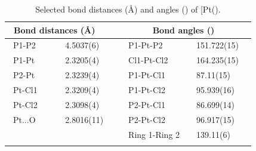 \begin{table}[ht]
\caption[Selected bond distances (\AA) and angles (\degrees) of [Pt(\tButhixantphos)\ce{Cl2]}]{Selected bond distances (\AA) and angles (\degrees) of [Pt(\tButhixantphos)\ce{Cl2]}.}
\label{table:crystalthixantphosplatinumdichloride:lengths}
\small
\begin{center}
\begin{tabular}{l l l l}
	\toprule
	\multicolumn{2}{l}{\bfseries{~Bond distances (\si{\angstrom})}} & \multicolumn{2}{c}{\bfseries{Bond angles (\degrees)}} \\
	\midrule		
	~P1-P2		~~&~~4.5037(6)~~	&~~P1-Pt-P2			&~~151.722(15)~~	\\	
	~P1-Pt		~~&~~2.3205(4)~~	&~~Cl1-Pt-Cl2			&~~164.235(15)~~	\\
	~P2-Pt		~~&~~2.3239(4)~~	&~~P1-Pt-Cl1			&~~87.11(15)~~	\\
	~Pt-Cl1		~~&~~2.3209(4)~~	&~~P1-Pt-Cl2			&~~95.939(16)~~	\\
	~Pt-Cl2		~~&~~2.3098(4)~~	&~~P2-Pt-Cl1			&~~86.699(14)~~	\\
	~Pt...O		~~&~~2.8016(11)~~	&~~P2-Pt-Cl2			&~~96.917(15)~~	\\
	~				&			&~~Ring 1-Ring 2		&~~139.11(6)~~	\\
	\bottomrule{}
\end{tabular}
\end{center}
\end{table}

